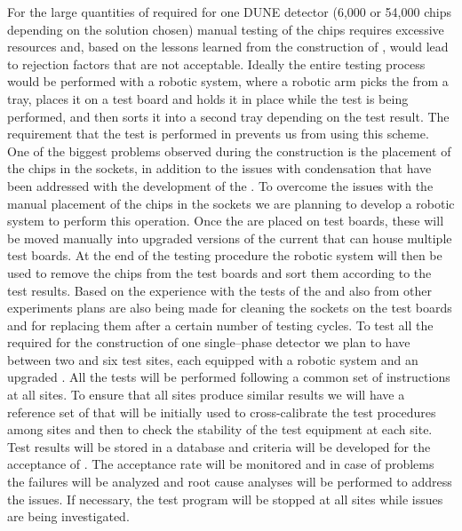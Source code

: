 For the large quantities of
 required for one DUNE  detector
(6,000 or 54,000 chips depending on the  solution
chosen) manual testing of the chips requires excessive 
resources and, based on the lessons learned from the 
construction of , would lead to rejection
factors that are not acceptable. Ideally the entire testing
process would be performed with a robotic system, where 
a robotic arm picks the  from a tray, places
it on a test board and holds it in place while the test
is being performed, and then sorts it into a second tray
depending on the test result. The requirement that the test
is performed in \lntwo prevents us from using this
scheme. One of the biggest problems observed during the
 construction is the placement of the chips in
the sockets, in addition to the issues with condensation
that have been addressed with the development of the .
To overcome the issues with the manual placement of the chips in
the sockets we are planning to develop a robotic system
to perform this operation. Once the  are 
placed on test boards, these will be moved manually into 
upgraded versions of the current  that can
house multiple test boards. At the end of the testing
procedure the robotic system will then be used to remove
the chips from the test boards and sort them according to
the test results. Based on the experience with the tests of
the   and also from other experiments
plans are also being made for cleaning the sockets on the 
test boards and for replacing them after a certain number of
testing cycles. To test all the  required for
the construction of one single--phase detector we plan to
have between two and six test sites, each equipped with a
robotic system and an upgraded . All the tests
will be performed following a common set of instructions
at all sites. To ensure that all sites produce similar
results we will have a reference set of 
that will be initially used to cross-calibrate the 
test procedures among sites and then to check the 
stability of the test equipment at each site. Test results will
be stored in a database and criteria will be developed
for the acceptance of . The acceptance rate 
will be monitored and in case of problems
the failures will be analyzed and root cause analyses
will be performed to address the issues. If necessary,
the test program will be stopped at all sites while 
issues are being investigated.

